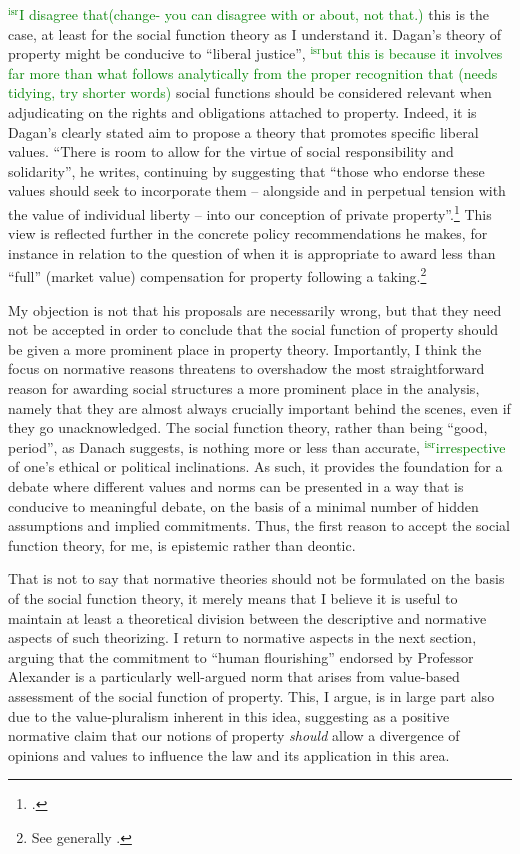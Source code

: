 \documentclass[12pt,a4paper]{book} %
\newcommand{\isr}[1]{\textcolor{green}{$^{\textrm{isr}}${#1}}}
\begin{document}
\isr{I disagree that(change- you can disagree with or about, not that.)} this is the case, at least for the social function theory as I understand it. Dagan's theory of property might be conducive to ``liberal justice'', \isr{but this is because it involves far more than what follows analytically from the proper recognition that (needs tidying, try shorter words)}  social functions should be considered relevant when adjudicating on the rights and obligations attached to property. Indeed, it is Dagan's clearly stated aim to propose a theory that promotes specific liberal values. ``There is room to allow for the virtue of social responsibility and solidarity'', he writes, continuing by suggesting that ``those who endorse these values should seek to incorporate them -- alongside and in perpetual tension with the value of individual liberty -- into our conception of private property''.\footcite[802]{dagan99} This view is reflected further in the concrete policy recommendations he makes, for instance in relation to the question of when it is appropriate to award less than ``full'' (market value) compensation for property following a taking.\footnote{See generally \cite{dagan14b}.}

My objection is not that his proposals are necessarily wrong, but that they need not be accepted in order to conclude that the social function of property should be given a more prominent place in property theory. Importantly, I think the focus on normative reasons threatens to overshadow the most straightforward reason for awarding social structures a more prominent place in the analysis, namely that they are almost always crucially important behind the scenes, even if they go unacknowledged. The social function theory, rather than being ``good, period'', as Danach suggests, is nothing more or less than accurate, \isr{irrespective} of one's ethical or political inclinations. As such, it provides the foundation for a debate where different values and norms can be presented in a way that is conducive to meaningful debate, on the basis of a minimal number of hidden assumptions and implied commitments. Thus, the first reason to accept the social function theory, for me, is epistemic rather than deontic.

That is not to say that normative theories should not be formulated on the basis of the social function theory, it merely means that I believe it is useful to maintain at least a theoretical division between the descriptive and normative aspects of such theorizing. I return to normative aspects in the next section, arguing that the commitment to ``human flourishing'' endorsed by Professor Alexander is a particularly well-argued norm that arises from value-based assessment of the social function of property. This, I argue, is in large part also due to the value-pluralism inherent in this idea, suggesting as a positive normative claim that our notions of property {\it should} allow a divergence of opinions and values to influence the law and its application in this area.
\end{document}
